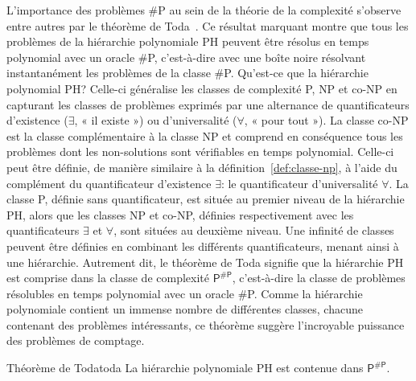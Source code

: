 L'importance des problèmes \textsf{\#P} au sein de la théorie de la complexité s'observe entre autres par le théorème de Toda~\cite{todaPPHardPolynomialTime1991}. Ce résultat marquant montre que tous les problèmes de la hiérarchie polynomiale \textsf{PH} peuvent être résolus en temps polynomial avec un oracle \textsf{\#P}, c'est-à-dire avec une boîte noire résolvant instantanément les problèmes de la classe \textsf{\#P}. Qu'est-ce que la hiérarchie polynomial \textsf{PH}? Celle-ci généralise les classes de complexité \textsf{P}, \textsf{NP} et \textsf{co-NP} en capturant les classes de problèmes exprimés par une alternance de quantificateurs d'existence ($\exists$, « il existe ») ou d'universalité ($\forall$, « pour tout »). La classe \textsf{co-NP} est la classe complémentaire à la classe \textsf{NP} et comprend en conséquence tous les problèmes dont les non-solutions sont vérifiables en temps polynomial. Celle-ci peut être définie, de manière similaire à la définition~\ref{def:classe-np}, à l'aide du complément du quantificateur d'existence $\exists$: le quantificateur d'universalité $\forall$. La classe \textsf{P}, définie sans quantificateur, est située au premier niveau de la hiérarchie \textsf{PH}, alors que les classes \textsf{NP} et \textsf{co-NP}, définies respectivement avec les quantificateurs $\exists$ et $\forall$, sont situées au deuxième niveau. Une infinité de classes peuvent être définies en combinant les différents quantificateurs, menant ainsi à une hiérarchie. Autrement dit, le théorème de Toda signifie que la hiérarchie \textsf{PH} est comprise dans la classe de complexité $\textsf{P}^{\textsf{\#P}}$, c'est-à-dire la classe de problèmes résolubles en temps polynomial avec un oracle \textsf{\#P}. Comme la hiérarchie polynomiale contient un immense nombre de différentes classes, chacune contenant des problèmes intéressants, ce théorème suggère l'incroyable puissance des problèmes de comptage.

\begin{subtheorem}{Théorème de Toda}{toda}
    La hiérarchie polynomiale \textsf{PH} est contenue dans $\textsf{P}^{\textsf{\#P}}$.
\end{subtheorem}

